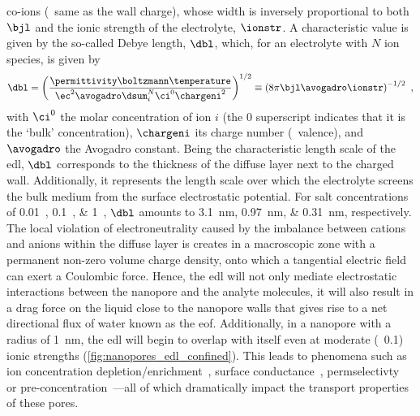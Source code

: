 co-ions (\ie~same as the wall charge), whose width is inversely proportional to both $\bjl$ and the ionic
strength of the electrolyte, $\ionstr$. A characteristic value is given by the so-called Debye length, $\dbl$,
which, for an electrolyte with $N$ ion species, is given by~\cite{Bocquet-2010}
%
\begin{equation}\label{eq:nanopores_debye_length}
  \dbl = \left(
          \dfrac{ \permittivity \boltzmann \temperature }%
                { \ec^2 \avogadro \dsum_i^N \ci^0 \chargeni^2 } \right)^{1/2}
       \equiv \left( 8 \pi \bjl \avogadro \ionstr \right)^{-1/2}
  \text{ ,}
\end{equation}
%
with $\ci^0$ the molar concentration of ion $i$ (the $0$ superscript indicates that it is the `bulk'
concentration), $\chargeni$ its charge number (\ie~valence), and $\avogadro$ the Avogadro constant. Being the
characteristic length scale of the \gls{edl}, $\dbl$ corresponds to the thickness of the diffuse layer next to
the charged wall. Additionally, it represents the length scale over which the electrolyte screens the bulk
medium from the surface electrostatic potential. For salt concentrations of \SIlist{0.01;0.1;1}{\Molar},
$\dbl$ amounts to \SIlist{3.1;0.97;0.31}{\nm}, respectively. The local violation of electroneutrality caused
by the imbalance between cations and anions within the diffuse layer is creates in a macroscopic zone with a
permanent non-zero volume charge density, onto which a tangential electric field can exert a Coulombic force.
Hence, the \gls{edl} will not only mediate electrostatic interactions between the nanopore and the analyte
molecules, it will also result in a drag force on the liquid close to the nanopore walls that gives rise to a
net directional flux of water known as the \gls{eof}. Additionally, in a nanopore with a radius of
\SI{1}{\nm}, the \gls{edl} will begin to overlap with itself even at moderate (\eg~\SI{0.1}{\Molar}) ionic
strengths (\cref{fig:nanopores_edl_confined}). This leads to phenomena such as ion concentration
depletion/enrichment~\cite{Plecis-2005}, surface conductance~\cite{Stein-2004},
permselectivty~\cite{Plecis-2005} or pre-concentration~\cite{Pu-2004}---all of which dramatically impact the
transport properties of these pores.

